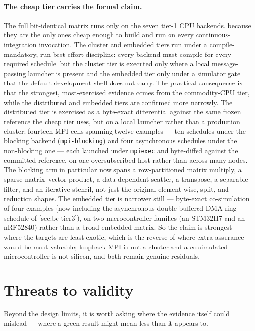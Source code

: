 \paragraph{The cheap tier carries the formal claim.} The full bit-identical matrix
runs only on the seven tier-1 CPU backends, because they are the only ones cheap
enough to build and run on every continuous-integration invocation. The cluster and
embedded tiers run under a compile-mandatory, run-best-effort discipline: every
backend must compile for every required schedule, but the cluster tier is executed
only where a local message-passing launcher is present and the embedded tier only
under a simulator gate that the default development shell does not carry. The
practical consequence is that the strongest, most-exercised evidence comes from the
commodity-CPU tier, while the distributed and embedded tiers are confirmed more
narrowly. The distributed tier is exercised as a byte-exact differential against the
same frozen reference the cheap tier uses, but on a local launcher rather than a
production cluster: fourteen MPI cells spanning twelve examples --- ten schedules
under the blocking backend (\texttt{mpi-blocking}) and four asynchronous schedules
under the non-blocking one --- each launched under \texttt{mpiexec} and byte-diffed
against the committed reference, on one oversubscribed host rather than across many
nodes. The blocking arm in particular now spans a row-partitioned matrix multiply, a sparse
matrix--vector product, a data-dependent scatter, a transpose, a separable filter, and an iterative
stencil, not just the original element-wise, split, and reduction shapes. The
embedded tier is narrower still --- byte-exact co-simulation of four examples
(now including the asynchronous double-buffered DMA-ring schedule of \cref{sec:be-tier3}),
on two microcontroller families (an STM32H7 and an nRF52840) rather than a broad
embedded matrix. So the claim is
strongest where the targets are least exotic, which is the reverse of where extra
assurance would be most valuable; loopback MPI is not a cluster and a co-simulated
microcontroller is not silicon, and both remain genuine residuals.

\section{Threats to validity}\label{sec:disc-threats}

Beyond the design limits, it is worth asking where the evidence itself could
mislead --- where a green result might mean less than it appears to.

